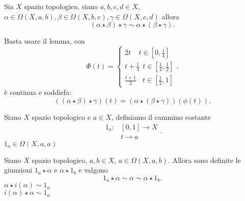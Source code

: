 \documentclass[12px]{article}
\begin{document}
\begin{lemm}
	Sia $X$ spazio topologico, siano $a,b,c,d\in X$,  $\alpha\in\Omega(X,a,b), \beta\in \Omega (X,b,c), \gamma\in\Omega(X,c,d)$ allora
	 \[
		 (\alpha\star\beta)\star\gamma\sim\alpha\star(\beta\star\gamma)
	.\] 
\end{lemm}
\begin{dimo}
	Basta usare il lemma, con
	\[
	\Phi(t) = \begin{cases}
		2t \ \ \ \ \ t\in[0,\frac 14]\\
		t + \frac 14 \ \ t\in [\frac 14, \frac 12]\\
		\frac{t + 1}{2}\ \ \ \ t\in [\frac 12, 1]
	\end{cases}
	.\] 
	è continua e soddisfa:
	\[
		((\alpha\star\beta)\star\gamma)(t) = (\alpha\star(\beta\star\gamma))(\phi(t))
	.\] 
\end{dimo}
\begin{defi}
	Siano $X$ spazio topologico e $a\in X$, definiamo il cammino costante
	 \[
		 \begin{aligned}
		 	
			 1_a:&[0,1] \rightarrow X\\
			     &t \rightarrow a
		 \end{aligned}
	.\] 
	$1_a\in\Omega(X,a,a)$
\end{defi}
\begin{lemm}
	Siano $X$ spazio topologico, $a,b\in X$,  $a\in \Omega(X,a,b).$ Allora sono definite le giunzioni  $1_a\star\alpha$ e $\alpha\star 1_b$ e valgono 
	\[
	1_a\star\alpha \sim\alpha\sim\alpha\star 1_b
	.\] 
	$\alpha\star i(\alpha)\sim 1_a$\\
	 $i(\alpha)\star\alpha\sim 1_a$
\end{lemm}
\end{document}
